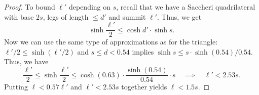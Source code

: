 \documentclass[a4paper,english,cleveref,thm-restate]{lipics-v2021}
\begin{document}
\begin{proof}
    To bound $\ell'$ depending on $s$, recall that we have a Saccheri quadrilateral with base $2s$, legs of length $\le d'$ and summit $\ell'$.
    Thus, we get
    \begin{equation*}
        \sinh \frac{\ell'}{2} \le \cosh d' \cdot \sinh s.
    \end{equation*}
    Now we can use the same type of approximations as for the triangle: $\ell' / 2 \le \sinh(\ell' / 2)$ and $s \le d < 0.54$ implies $\sinh s \le s \cdot \sinh(0.54) / 0.54$.  Thus, we have 
    \begin{equation*}
        \frac{\ell'}{2} \le
        \sinh \frac{\ell'}{2} \le
        \cosh(0.63) \cdot \frac{\sinh(0.54)}{0.54} \cdot s
        \quad \implies \quad
        \ell' < 2.53 s.
    \end{equation*}
    Putting $\ell < 0.57\ell'$ and $\ell' < 2.53 s$ together yields $\ell < 1.5 s$.



\end{proof}
\end{document}
